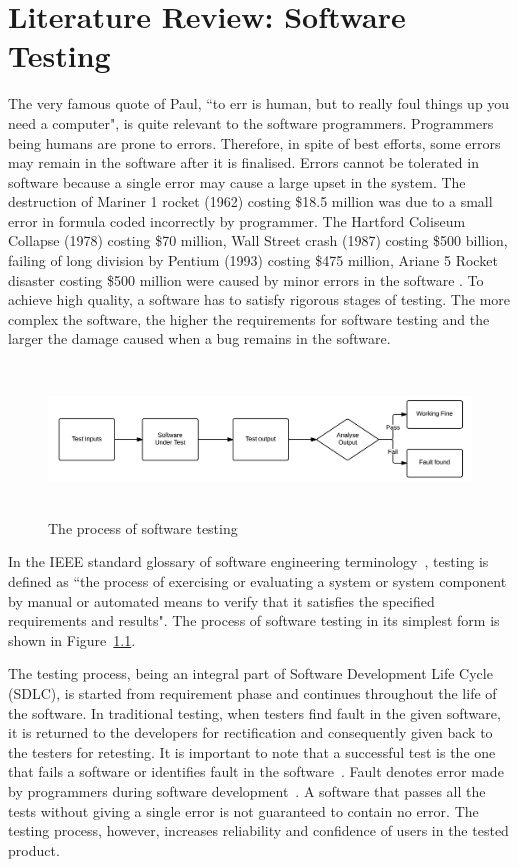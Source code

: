 \chapter{Literature Review: Software Testing}
\label{chap:softwareTesting}
The very famous quote of Paul, ``to err is human, but to really foul things up you need a computer", is quite relevant to the software programmers. Programmers being humans are prone to errors. Therefore, in spite of best efforts, some errors may remain in the software after it is finalised.  Errors cannot be tolerated in software because a single error may cause a large upset in the system. The destruction of Mariner 1 rocket (1962) costing \$18.5 million was due to a small error in formula coded incorrectly by programmer. The Hartford Coliseum Collapse (1978) costing \$70 million, Wall Street crash (1987) costing \$500 billion, failing of long division by Pentium (1993) costing \$475 million, Ariane 5 Rocket disaster costing \$500 million were caused by minor errors in the software \cite{toweysoftware}. To achieve high quality, a software has to satisfy rigorous stages of testing. The more complex the software, the higher the requirements for software testing and the larger the damage caused when a bug remains in the software.

\begin{figure}[h]
	\centering
	\includegraphics[width=15.5cm, height=4cm]{chapter2/softwareTesting.png}
	\caption{The process of software testing}
	\label{fig:softwareTesting}
\end{figure}

In the IEEE standard glossary of software engineering terminology~\cite{american1984}, testing is defined as ``the process of exercising or evaluating a system or system component by manual or automated means to verify that it satisfies the specified requirements and results". The process of software testing in its simplest form is shown in Figure~\ref{fig:softwareTesting}. 

The testing process, being an integral part of Software Development Life Cycle (SDLC), is started from requirement phase and continues throughout the life of the software. In traditional testing, when testers find fault in the given software, it is returned to the developers for rectification and consequently given back to the testers for retesting. It is important to note that a successful test is the one that fails a software or identifies fault in the software~\cite{Myers1979}. Fault denotes error made by programmers during software development~\cite{american1984}. A software that passes all the tests without giving a single error is not guaranteed to contain no error. The testing process, however, increases reliability and confidence of users in the tested product. \\


